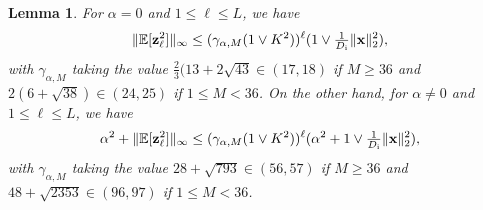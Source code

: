 \documentclass[twoside]{article}
\renewcommand{\ss}[1]{_{\text{#1}}}
\newcommand{\vx}{\mathbf{x}}
\newcommand{\vz}{\mathbf{z}}
\newcommand{\E}{\mathbb{E}}
\renewcommand{\ss}[1]{_{\text{#1}}}        %
\DeclarePairedDelimiter\norm{\|}{\|}             %
\theoremstyle{theoremstyle}
\newtheorem{lemma}[theorem]{Lemma}
\begin{document}
\begin{lemma}\label{lem:z-squared-recursion}
    For $\alpha=0$ and $1 \leq \ell \leq L$, we have
    \begin{equation}
        \norm{\E[\vz_\ell^2]}_\infty \leq (\gamma_{\alpha, M} (1 \lor K^2))^{\ell} (1\lor \tfrac1{D\ss{i}}\|\vx\|^2_2),
    \end{equation}
    with $\gamma_{\alpha, M}$ taking the value $\tfrac23(13+2\sqrt{43} \in (17,18)$ if $M\ge 36$ and $2(6+\sqrt{38}) \in (24,25)$ if $1\le M < 36$.
    On the other hand, for $\alpha \neq 0$ and $1 \leq \ell \le L$, we have
    \begin{equation}
        \alpha^2 + \norm{\E[\vz_\ell^2]}_\infty \leq (\gamma_{\alpha, M} (1 \lor K^2))^{\ell} (\alpha^2 + 1\lor \tfrac1{D\ss{i}} \|\vx\|^2_2),
    \end{equation}
    with $\gamma_{\alpha, M}$ taking the value $28 + \sqrt{793} \in (56,57)$ if $M\ge 36$ and $48 + \sqrt{2353} \in (96,97)$ if $1\le M < 36$.
\end{lemma}
\end{document}
